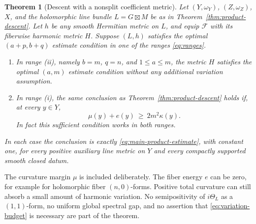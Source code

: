 \documentclass[11pt,reqno]{amsart}
\numberwithin{equation}{section}
\newtheorem{theorem}{Theorem}[section]
\theoremstyle{definition}
\theoremstyle{remark}
\newcommand{\cF}{\mathcal F}
\begin{document}
\begin{theorem}[Descent with a nonsplit coefficient metric]\label{thm:variable-metric}
Let $(Y,\omega_Y)$, $(Z,\omega_Z)$, $X$, and the holomorphic line bundle $L=G\boxtimes M$ be as in Theorem~\ref{thm:product-descent}. Let $h$ be any smooth Hermitian metric on $L$, and equip $\cF$ with its fiberwise harmonic metric $H$. Suppose $(L,h)$ satisfies the optimal $(a+p,b+q)$ estimate condition in one of the ranges \eqref{eq:ranges}.
\begin{enumerate}
\item In range \textnormal{(ii)}, namely $b=m$, $q=n$, and $1\leq a\leq m$, the metric $H$ satisfies the optimal $(a,m)$ estimate condition without any additional variation assumption.
\item In range \textnormal{(i)}, the same conclusion as Theorem~\ref{thm:product-descent} holds if, at every $y\in Y$,
\begin{equation}\label{eq:variation-budget}
 \boxed{\quad \mu(y)+e(y)\ \geq\ 2m^2\kappa(y).\quad}
\end{equation}
In fact this sufficient condition works in both ranges.
\end{enumerate}
In each case the conclusion is exactly \eqref{eq:main-product-estimate}, with constant one, for every positive auxiliary line metric on $Y$ and every compactly supported smooth closed datum.
\end{theorem}

The curvature margin $\mu$ is included deliberately. The fiber energy $e$ can be zero, for example for holomorphic fiber $(n,0)$-forms. Positive total curvature can still absorb a small amount of harmonic variation. No semipositivity of $i\Theta_L$ as a $(1,1)$-form, no uniform global spectral gap, and no assertion that \eqref{eq:variation-budget} is necessary are part of the theorem.
\end{document}
